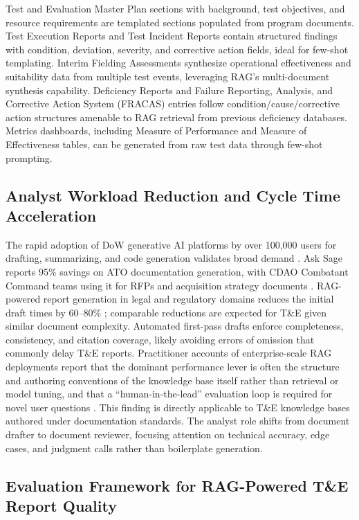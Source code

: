 \documentclass[12pt,letterpaper]{article}
\let\cite\parencite
\begin{document}
Test and Evaluation Master Plan sections with background, test objectives, and resource requirements are templated sections populated from program documents. Test Execution Reports and Test Incident Reports contain structured findings with condition, deviation, severity, and corrective action fields, ideal for few-shot templating. Interim Fielding Assessments synthesize operational effectiveness and suitability data from multiple test events, leveraging RAG's multi-document synthesis capability. Deficiency Reports and Failure Reporting, Analysis, and Corrective Action System (FRACAS) entries follow condition/cause/corrective action structures amenable to RAG retrieval from previous deficiency databases. Metrics dashboards, including Measure of Performance and Measure of Effectiveness tables, can be generated from raw test data through few-shot prompting.

\subsection{Analyst Workload Reduction and Cycle Time Acceleration}

The rapid adoption of DoW generative AI platforms by over 100,000 users for drafting, summarizing, and code generation validates broad demand \cite{gdit2024,vanroo2025}. Ask Sage reports 95\% savings on ATO documentation generation, with CDAO Combatant Command teams using it for RFPs and acquisition strategy documents \cite{asksage2025}. RAG-powered report generation in legal and regulatory domains reduces the initial draft times by 60--80\% \cite{noy2023,brynjolfsson2023}; comparable reductions are expected for T\&E given similar document complexity. Automated first-pass drafts enforce completeness, consistency, and citation coverage, likely avoiding errors of omission that commonly delay T\&E reports. Practitioner accounts of enterprise-scale RAG deployments report that the dominant performance lever is often the structure and authoring conventions of the knowledge base itself rather than retrieval or model tuning, and that a ``human-in-the-lead'' evaluation loop is required for novel user questions \cite{packowski2024}. This finding is directly applicable to T\&E knowledge bases authored under documentation standards. The analyst role shifts from document drafter to document reviewer, focusing attention on technical accuracy, edge cases, and judgment calls rather than boilerplate generation.

\subsection{Evaluation Framework for RAG-Powered T\&E Report Quality}
\end{document}
